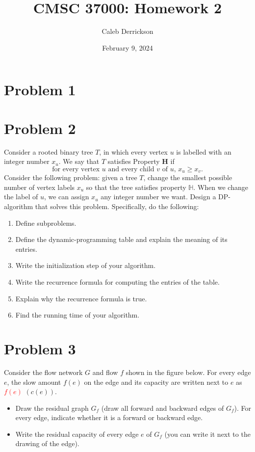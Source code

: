 

\title{CMSC 37000: Homework 2}
\author{Caleb Derrickson}
\date{February 9, 2024}

\usetikzlibrary{positioning, arrows.meta, bending}


\onehalfspacing
\maketitle
\allowdisplaybreaks


\tableofcontents

\newpage
\section{Problem 1}


\newpage
\section{Problem 2}
Consider a rooted binary tree $T$, in which every vertex $u$ is labelled with an integer number $x_u$. We say that $T$ satisfies Property $\mathbf{H}$ if
\[\text{for every vertex $u$ and every child $v$ of $u$, $x_u \geq x_v$}.\]
Consider the following problem: given a tree $T$, change the smallest possible number of vertex labels $x_u$ so that the tree satisfies property $\mathbb{H}$. When we change the label of $u$, we can assign $x_u$ any integer number we want. Design a DP-algorithm that solves this problem. Specifically, do the following:
\begin{enumerate}
    \item Define subproblems.
    \item Define the dynamic-programming table and explain the meaning of its entries.
    \item Write the initialization step of your algorithm.
    \item Write the recurrence formula for computing the entries of the table. 
    \item Explain why the recurrence formula is true.
    \item Find the running time of your algorithm.
\end{enumerate}
\newpage
\section{Problem 3}
Consider the flow network $G$ and flow $f$ shown in the figure below. For every edge $e$, the slow amount $f(e)$ on the edge and its capacity are written next to $e$ as \textcolor{red}{$f(e)$} $(c(e))$.
\begin{itemize}[$\bullet$]
    \item Draw the residual graph $G_f$ (draw all forward and backward edges of $G_f$). For every edge, indicate whether it is a forward or backward edge.
    \item Write the residual capacity of every edge $e$ of $G_f$ (you can write it next to the drawing of the edge).
\end{itemize}

